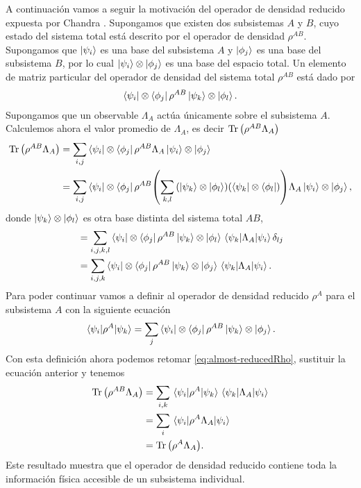 A continuación vamos a seguir la motivación del operador 
de densidad reducido expuesta por Chandra \cite{chandra2013quantum}. 
Supongamos que existen dos subsistemas $A$ y $B$, cuyo estado del 
sistema total está 
descrito por el operador de densidad $\rho^{AB}$. Supongamos que 
$\ket{\psi_i}$ es una base  del subsistema $A$ y $\ket{\phi_j}$ es
una base del subsistema $B$, por lo cual $\ket{\psi_i}\otimes \ket{\phi_j}$
es una base del espacio total. Un elemento de matriz particular 
del operador de densidad del sistema total $\rho^{AB}$ está dado por
\begin{align}
	\bra{\psi_i}\otimes\bra{\phi_j}\rho^{AB}\ket{\psi_k}\otimes\ket{\phi_l}.
\end{align}
Supongamos que un observable $\Lambda_A$ actúa únicamente sobre el 
subsistema $A$. Calculemos ahora el valor promedio de $\Lambda_A$, es decir
$\Tr\qty(\rho^{AB}\Lambda_A)$
\begin{align}
	\Tr \qty(\rho^{AB}\Lambda_A) &= \sum _{i,j} 
	\bra{\psi_i}\otimes\bra{\phi_j}\rho^{AB}\Lambda_A\ket{\psi_i}\otimes\ket{\phi_j} \\
	&= \sum _{i,j} 
	\bra{\psi_i}\otimes\bra{\phi_j}\rho^{AB}
	\qty(\sum _{k,l} \qty(\ket{\psi_k}\otimes\ket{\phi_l})
	\qty(\bra{\psi_k}\otimes\bra{\phi_l}))
	\Lambda_A\ket{\psi_i}\otimes\ket{\phi_j},
\end{align}
donde $\ket{\psi_k}\otimes\ket{\phi_l}$ es otra base distinta 
del sistema total $AB$,
\begin{align}
	&= \sum _{i,j,k,l} 
	\bra{\psi_i}\ten\bra{\phi_j}\rho^{AB}\ket{\psi_k}\ten\ket{\phi_l}
	\matrixel{\psi_k}{\Lambda_A}{\psi_i}\delta _{lj} \\
	&= \sum _{i,j,k} 
	\bra{\psi_i}\ten\bra{\phi_j}\rho^{AB}\ket{\psi_k}\ten\ket{\phi_j}
	\matrixel{\psi_k}{\Lambda_A}{\psi_i}. \label{eq:almost-reducedRho}
\end{align}
Para poder continuar vamos a definir al operador de densidad
reducido $\rho^A$ para el subsistema $A$ con la siguiente ecuación
\cite{chandra2013quantum}
\begin{align}
	\matrixel{\psi_i}{\rho^A}{\psi_k} = 
	\sum _j \bra{\psi_i}\ten\bra{\phi_j}\rho^{AB}\ket{\psi_k}\ten\ket{\phi_j}.
	\label{eq:reducedRho-def1}
\end{align}
Con esta definición ahora podemos retomar  \eqref{eq:almost-reducedRho},
sustituir la ecuación anterior y tenemos
\begin{align}
	\Tr \qty(\rho^{AB}\Lambda_A)&= \sum _{i,k}
	\matrixel{\psi_i}{\rho^A}{\psi_k} \matrixel{\psi_k}{\Lambda_A}{\psi_i}\\
	&= \sum_i \matrixel{\psi_i}{\rho^A\Lambda_A}{\psi_i}\\
	&= \Tr \qty(\rho^A\Lambda_A). \label{eq:reduced-works}
\end{align}
Este resultado muestra que el operador de densidad reducido 
contiene toda la información física accesible de un subsistema individual.


